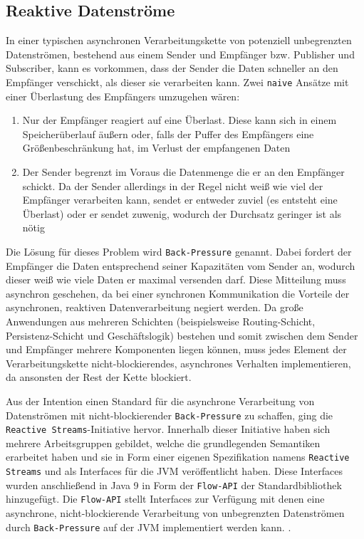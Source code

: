 \subsection{Reaktive Datenströme}
\label{section:reaktive_datenströme}
In einer typischen asynchronen Verarbeitungskette von potenziell unbegrenzten Datenströmen,
bestehend aus einem Sender und Empfänger bzw. Publisher und Subscriber, kann es vorkommen,
dass der Sender die Daten schneller an den Empfänger verschickt, als dieser sie verarbeiten kann.
Zwei \verb|naive| Ansätze mit einer Überlastung des Empfängers umzugehen wären:
\begin{enumerate}
  \item Nur der Empfänger reagiert auf eine Überlast. Diese kann sich in einem Speicherüberlauf äußern oder, falls der Puffer des Empfängers eine Größenbeschränkung
        hat, im Verlust der empfangenen Daten
  \item Der Sender begrenzt im Voraus die Datenmenge die er an den Empfänger schickt. Da der Sender allerdings in der Regel nicht weiß wie viel der Empfänger
        verarbeiten kann, sendet er entweder zuviel (es entsteht eine Überlast) oder er sendet zuwenig, wodurch der Durchsatz geringer ist als nötig \parencite{JavaSpektrum2015}
\end{enumerate}
Die Lösung für dieses Problem wird \verb|Back-Pressure| genannt.
Dabei fordert der Empfänger die Daten entsprechend seiner Kapazitäten vom Sender an, wodurch dieser weiß wie viele Daten er maximal versenden darf.
Diese Mitteilung muss asynchron geschehen, da bei einer synchronen Kommunikation die Vorteile der asynchronen, reaktiven Datenverarbeitung
negiert werden.
Da große Anwendungen aus mehreren Schichten (beispielsweise Routing-Schicht, Persistenz-Schicht und Geschäftslogik) bestehen und somit zwischen
dem Sender und Empfänger mehrere Komponenten liegen können, muss jedes
Element der Verarbeitungskette nicht-blockierendes, asynchrones Verhalten implementieren, da ansonsten der Rest der Kette blockiert.

Aus der Intention einen Standard für die asynchrone Verarbeitung von Datenströmen mit nicht-blockierender \verb|Back-Pressure|
zu schaffen, ging die \verb|Reactive Streams|-Initiative hervor.
Innerhalb dieser Initiative haben sich mehrere Arbeitsgruppen gebildet, welche die grundlegenden Semantiken erarbeitet haben und
sie in Form einer eigenen Spezifikation namens \verb|Reactive Streams| und als Interfaces für die JVM veröffentlicht haben.\parencite{ReactiveStreams}
Diese Interfaces wurden anschließend in Java 9 in Form der \verb|Flow-API| der Standardbibliothek hinzugefügt.
Die \verb|Flow-API| stellt Interfaces zur Verfügung mit denen eine
asynchrone, nicht-blockierende Verarbeitung von unbegrenzten Datenströmen durch \verb|Back-Pressure| auf der JVM implementiert werden kann.
\parencite{OracleFlow}.

